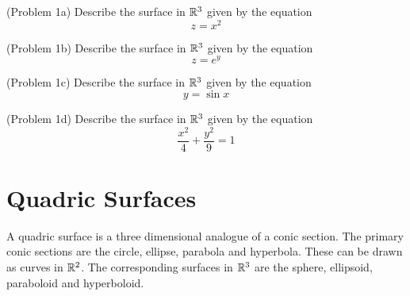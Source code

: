 \documentclass[handout]{ximera}
\begin{document}
\begin{problem}(Problem 1a)
Describe the surface in $\mathbb R^3$ given by the equation
\[
z= x^2
\]
\end{problem}

\begin{problem}(Problem 1b)
Describe the surface in $\mathbb R^3$ given by the equation
\[
z= e^y
\]
\end{problem}

\begin{problem}(Problem 1c)
Describe the surface in $\mathbb R^3$ given by the equation
\[
y= \sin{x}
\]
\end{problem}

\begin{problem}(Problem 1d)
Describe the surface in $\mathbb R^3$ given by the equation
\[
\frac{x^2}{4} + \frac{y^2}{9} = 1
\]
\end{problem}



\section{Quadric Surfaces}
A quadric surface is a three dimensional analogue of a conic section.
The primary conic sections are the circle, ellipse, parabola and hyperbola. 
These can be drawn as curves in $\mathbb R^2$.
The corresponding surfaces in $\mathbb R^3$ are the sphere, ellipsoid, paraboloid and hyperboloid. 
\begin{image}
\end{image}


\begin{image}
\end{image}







\begin{image}
\end{image}
\end{document}
